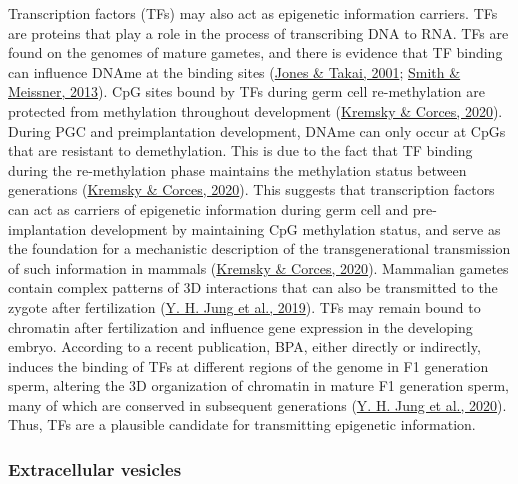 \documentclass[12pt,twoside]{reedthesis}
\begin{document}
Transcription factors (TFs) may also act as epigenetic information
carriers. TFs are proteins that play a role in the process of
transcribing DNA to RNA. TFs are found on the genomes of mature gametes,
and there is evidence that TF binding can influence DNAme at the binding
sites (\protect\hyperlink{ref-jones2001}{Jones \& Takai, 2001}; \protect\hyperlink{ref-smith2013}{Smith \& Meissner, 2013}). CpG sites bound by TFs during germ cell
re-methylation are protected from methylation throughout development
(\protect\hyperlink{ref-kremsky2020}{Kremsky \& Corces, 2020}). During PGC and preimplantation development, DNAme can
only occur at CpGs that are resistant to demethylation. This is due to
the fact that TF binding during the re-methylation phase maintains the
methylation status between generations (\protect\hyperlink{ref-kremsky2020}{Kremsky \& Corces, 2020}). This suggests
that transcription factors can act as carriers of epigenetic information
during germ cell and pre-implantation development by maintaining CpG
methylation status, and serve as the foundation for a mechanistic
description of the transgenerational transmission of such information in
mammals (\protect\hyperlink{ref-kremsky2020}{Kremsky \& Corces, 2020}). Mammalian gametes contain complex patterns of 3D
interactions that can also be transmitted to the zygote after
fertilization (\protect\hyperlink{ref-jung2019}{Y. H. Jung et al., 2019}). TFs may remain bound to chromatin after
fertilization and influence gene expression in the developing embryo.
According to a recent publication, BPA, either directly or indirectly,
induces the binding of TFs at different regions of the genome in F1
generation sperm, altering the 3D organization of chromatin in mature F1
generation sperm, many of which are conserved in subsequent generations
(\protect\hyperlink{ref-jung2020}{Y. H. Jung et al., 2020}). Thus, TFs are a plausible candidate for transmitting
epigenetic information.

\hypertarget{extracellular-vesicles}{%
\subsubsection*{Extracellular vesicles}\label{extracellular-vesicles}}
\end{document}
